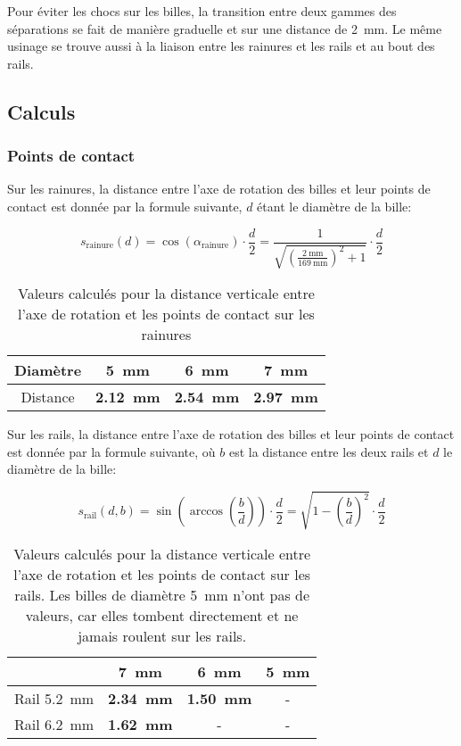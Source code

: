 Pour éviter les chocs sur les billes, la transition entre deux gammes des séparations se fait de manière graduelle et sur une distance de \SI{2}{\mm}. Le même usinage se trouve aussi à la liaison entre les rainures et les rails et au bout des rails.

\subsection{Calculs}
\label{calculs_tri}
\subsubsection{Points de contact}
Sur les rainures, la distance entre l'axe de rotation des billes et leur points de contact est donnée par la formule suivante, $d$ étant le diamètre de la bille:

\[s_{\text{rainure}}(d) = \cos(\alpha_{\text{rainure}}) \cdot \frac{d}{2} = \frac{1}{\sqrt{\left(\frac{\SI{2}{\milli\metre}}{\SI{169}{\milli\metre}}\right)^2+1}} \cdot \frac{d}{2}\]

\begin{table}[htbp]
    \centering
    \begin{tabular}{|c|c|c|c|}
        \hline
        Diamètre    & \SI{5}{\mm} & \SI{6}{\mm} & \SI{7}{\mm} \\
        \hline
        Distance    & \textbf{\SI{2.12}{\mm}} & \textbf{\SI{2.54}{\mm}} & \textbf{\SI{2.97}{\mm}} \\
        \hline
    \end{tabular}
    \caption{Valeurs calculés pour la distance verticale entre l'axe de rotation et les points de contact sur les rainures}
    \label{tab:distance_rainures}
\end{table}

Sur les rails, la distance entre l'axe de rotation des billes et leur points de contact est donnée par la formule suivante, où $b$ est la distance entre les deux rails et $d$ le diamètre de la bille:


\[s_{\text{rail}}(d,b) = \sin\left(\arccos\left(\frac{b}{d}\right)\right) \cdot \frac{d}{2} = \sqrt{1-\left(\frac{b}{d}\right)^{2}} \cdot \frac{d}{2}\]

\begin{table}[htbp]
    \centering
    \begin{tabular}{|c|c|c|c|}
        \hline
         & \SI{7}{\mm} & \SI{6}{\mm} & \SI{5}{\mm} \\
        \hline
        Rail \SI{5.2}{\mm}& \textbf{\SI{2.34}{\mm}} & \textbf{\SI{1.50}{\mm}} & - \\
        \hline
        Rail \SI{6.2}{\mm}& \textbf{\SI{1.62}{\mm}} & - & - \\
        \hline
    \end{tabular}
    \caption{Valeurs calculés pour la distance verticale entre l'axe de rotation et les points de contact sur les rails. Les billes de diamètre \SI{5}{\mm} n'ont pas de valeurs, car elles tombent directement et ne jamais roulent sur les rails.}
    \label{tab:distance_rails}
\end{table}

